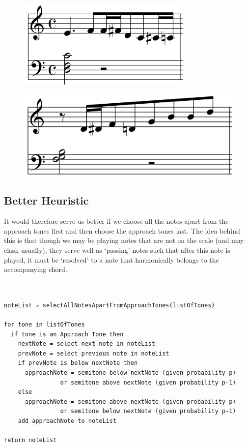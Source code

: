 \documentclass[pdftex,12pt,a4paper]{report}
\begin{document}
\begin{figure}[here]
  \centering
  \includegraphics[scale=0.6]{figure/lookbehindnoteselector.png}
  \label{fig:lookbehindnoteselector}
\end{figure}

\begin{figure}[here]
  \centering
  \includegraphics[scale=0.5]{figure/lookbehindnoteselector2.png}
  \label{fig:lookbehindnoteselector2}
\end{figure}

\subsection{Better Heuristic}
It would therefore serve us better if we choose all the notes apart from the approach tones first and then choose the approach tones last. The idea behind this is that though we may be playing notes that are not on the scale (and may clash usually), they serve well as `passing' notes such that after this note is played, it must be `resolved' to a note that harmonically belongs to the accompanying chord. 

\begin{verbatim}


noteList = selectAllNotesApartFromApproachTones(listOfTones)

for tone in listOfTones
  if tone is an Approach Tone then
    nextNote = select next note in noteList
    prevNote = select previous note in noteList
    if prevNote is below nextNote then
      approachNote = semitone below nextNote (given probability p)
                or semitone above nextNote (given probability p-1)
    else
      approachNote = semitone above nextNote (given probability p)
                or semitone below nextNote (given probability p-1)
    add approachNote to noteList

return noteList

\end{verbatim}
\end{document}
